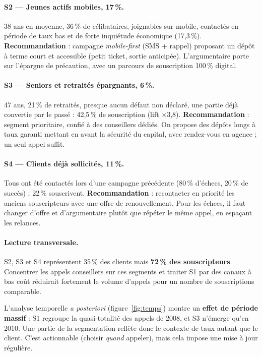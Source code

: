 \documentclass[11pt,a4paper]{article}
\begin{document}
\paragraph{\textcolor{s2}{S2 — Jeunes actifs mobiles, 17\,\%}.} 38 ans en moyenne, 36\,\% de célibataires, joignables sur mobile, contactés en période de taux bas et de forte inquiétude économique (17,3\,\%). \textbf{Recommandation} : campagne \emph{mobile-first} (SMS + rappel) proposant un dépôt à terme court et accessible (petit ticket, sortie anticipée). L'argumentaire porte sur l'épargne de précaution, avec un parcours de souscription 100\,\% digital.

\paragraph{\textcolor{s3}{S3 — Seniors et retraités épargnants, 6\,\%}.} 47 ans, 21\,\% de retraités, presque aucun défaut non déclaré, une partie déjà convertie par le passé : 42,5\,\% de souscription (lift ×3,8). \textbf{Recommandation} : segment prioritaire, confié à des conseillers dédiés. On propose des dépôts longs à taux garanti mettant en avant la sécurité du capital, avec rendez-vous en agence ; un seul appel suffit.

\paragraph{\textcolor{s4}{S4 — Clients déjà sollicités, 11\,\%}.} Tous ont été contactés lors d'une campagne précédente (80\,\% d'échecs, 20\,\% de succès) ; 22\,\% souscrivent. \textbf{Recommandation} : recontacter en priorité les anciens souscripteurs avec une offre de renouvellement. Pour les échecs, il faut changer d'offre et d'argumentaire plutôt que répéter le même appel, en espaçant les relances.

\paragraph{Lecture transversale.} S2, S3 et S4 représentent 35\,\% des clients mais \textbf{72\,\% des souscripteurs}. Concentrer les appels conseillers sur ces segments et traiter S1 par des canaux à bas coût réduirait fortement le volume d'appels pour un nombre de souscriptions comparable.

L'analyse temporelle \emph{a posteriori} (figure~\ref{fig:temps}) montre un \textbf{effet de période massif} : S1 regroupe la quasi-totalité des appels de 2008, et S3 n'émerge qu'en 2010. Une partie de la segmentation reflète donc le contexte de taux autant que le client. C'est actionnable (choisir \emph{quand} appeler), mais cela impose une mise à jour régulière.
\end{document}
